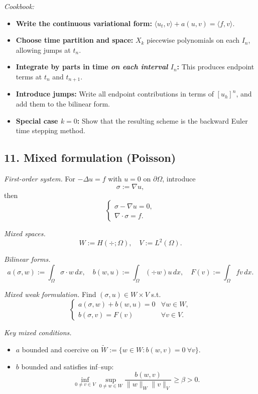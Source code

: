 \emph{Cookbook:}
\begin{itemize}[leftmargin=*]
    \item \textbf{Write the continuous variational form:}
          $\langle u_t, v\rangle + a(u,v) = \langle f, v\rangle$.
    \item \textbf{Choose time partition and space:}
          $X_k$ piecewise polynomials on each $I_n$, allowing jumps at $t_n$.
    \item \textbf{Integrate by parts in time \emph{on each interval} $I_n$:}
          This produces endpoint terms at $t_n$ and $t_{n+1}$.
    \item \textbf{Introduce jumps:}
          Write all endpoint contributions in terms of $[u_h]^n$, and add them to the bilinear form.
    \item \textbf{Special case $k=0$:}
          Show that the resulting scheme is the backward Euler time stepping method.
\end{itemize}

\subsection*{11. Mixed formulation (Poisson)}
\emph{First-order system.}
For $-\Delta u = f$ with $u=0$ on $\partial\Omega$, introduce
\[
    \sigma := \nabla u,
\]
then
\[
    \begin{cases}
        \sigma - \nabla u = 0, \\
        \nabla\cdot \sigma = f.
    \end{cases}
\]

\emph{Mixed spaces.}
\[
    W := H(\div;\Omega),\quad V := L^2(\Omega).
\]

\emph{Bilinear forms.}
\[
    a(\sigma,w) := \int_\Omega \sigma\cdot w\,dx,
    \quad
    b(w,u) := \int_\Omega (\div w) u\,dx,
    \quad
    F(v) := \int_\Omega f v\,dx.
\]

\emph{Mixed weak formulation.}
Find $(\sigma,u)\in W\times V$ s.t.
\[
    \begin{cases}
        a(\sigma,w) + b(w,u) = 0 & \forall w\in W, \\
        b(\sigma,v) = F(v)       & \forall v\in V.
    \end{cases}
\]

\emph{Key mixed conditions.}
\begin{itemize}
    \item $a$ bounded and coercive on $\widetilde W:=\{w\in W : b(w,v)=0\ \forall v\}$.
    \item $b$ bounded and satisfies inf--sup:
          \[
              \inf_{0\neq v\in V}\sup_{0\neq w\in W}
              \frac{b(w,v)}{\|w\|_W\|v\|_V} \ge \beta>0.
          \]
\end{itemize}

